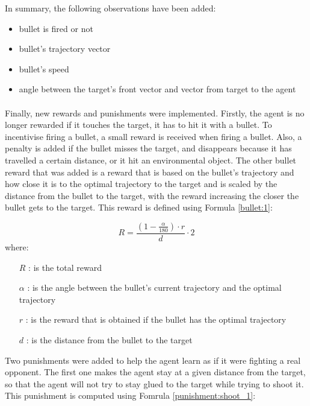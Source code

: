 In summary, the following observations have been added:
\begin{itemize}
    \item bullet is fired or not
    \item bullet's trajectory vector
    \item bullet's speed
    \item angle between the target's front vector and vector from target to the agent
\end{itemize}


\paragraph{}
Finally, new rewards and punishments were implemented. Firstly, the agent is no longer rewarded if it touches the target, it has to hit it with a bullet. To incentivise firing a bullet, a small reward is received when firing a bullet. Also, a penalty is added if the bullet misses the target, and disappears because it has travelled a certain distance, or it hit an environmental object. The other bullet reward that was added is a reward that is based on the bullet's trajectory and how close it is to the optimal trajectory to the target and is scaled by the distance from the bullet to the target, with the reward increasing the closer the bullet gets to the target. This reward is defined using Formula \ref{bullet:1}:

\begin{equation} \label{bullet:1}
    R = \frac{(1 - \frac{\alpha}{180}) \cdot r}{d} \cdot 2
\end{equation}
where:
\begin{itemize}
    \item [$R$]: is the total reward
    \item [$\alpha$]: is the angle between the bullet's current trajectory and the optimal trajectory
    \item [$r$]: is the reward that is obtained if the bullet has the optimal trajectory
    \item [$d$]: is the distance from the bullet to the target
\end{itemize}

Two punishments were added to help the agent learn as if it were fighting a real opponent. The first one makes the agent stay at a given distance from the target, so that the agent will not try to stay glued to the target while trying to shoot it. This punishment is computed using Fomrula \ref{punishment:shoot_1}:

